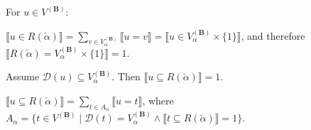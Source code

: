 For $u \in V^{(\mathbf{B})}$:

\quad $\llbracket u \in R(\check{\alpha}) \rrbracket = \sum_{v \in V_{\alpha}^{(\mathbf{B})}} \llbracket u = v \rrbracket = \llbracket u \in V_{\alpha}^{(\mathbf{B})} \times \{1\} \rrbracket$, and therefore $\llbracket R(\check{\alpha}) = V_{\alpha}^{(\mathbf{B})} \times \{1\} \rrbracket = 1$.

\quad Assume $\mathcal{D}(u) \subseteq V_{\alpha}^{(\mathbf{B})}$. Then $\llbracket u \subseteq R(\check{\alpha}) \rrbracket = 1$.

\quad $\llbracket u \subseteq R(\check{\alpha}) \rrbracket = \sum_{t \in A_{\alpha}} \llbracket u = t \rrbracket$, where $A_{\alpha} = \{t \in V^{(\mathbf{B})} \mid \mathcal{D}(t) = V_{\alpha}^{(\mathbf{B})} \land \llbracket t \subseteq R(\check{\alpha}) \rrbracket = 1\}$.
